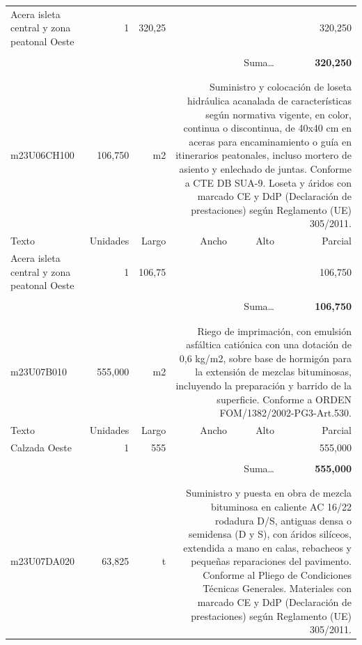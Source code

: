 \documentclass{book}%
\begin{document}
\begin{longtable}{lrrrrr}
\hline%
\multicolumn{1}{p{3.5cm}}{Acera isleta central y zona peatonal Oeste}&1&320,25&&&   320,250\\%
&&&&&\\%
\multicolumn{5}{r}{Suma\ldots}&\textbf{   320,250}\\%
\hline%
&&&&&\\%
&&&&&\\%
m23U06CH100&   106,750& m2&\multicolumn{3}{p{6cm}}{\scriptsize Suministro y colocación de loseta hidráulica acanalada de características según normativa vigente, en color, continua o discontinua, de 40x40 cm en aceras para encaminamiento o guía en itinerarios peatonales, incluso mortero de asiento y enlechado de juntas. Conforme a CTE DB SUA-9. Loseta y áridos con marcado CE y DdP (Declaración de prestaciones) según Reglamento (UE) 305/2011.\normalsize}\\%
Texto&Unidades&Largo&Ancho&Alto&Parcial\\%
\hline%
\multicolumn{1}{p{3.5cm}}{Acera isleta central y zona peatonal Oeste}&1&106,75&&&   106,750\\%
&&&&&\\%
\multicolumn{5}{r}{Suma\ldots}&\textbf{   106,750}\\%
\hline%
&&&&&\\%
&&&&&\\%
m23U07B010&   555,000& m2&\multicolumn{3}{p{6cm}}{\scriptsize Riego de imprimación, con emulsión asfáltica catiónica con una dotación de 0,6 kg/m2, sobre base de hormigón para la extensión de mezclas bituminosas, incluyendo la preparación y barrido de la superficie. Conforme a ORDEN FOM/1382/2002-PG3-Art.530.\normalsize}\\%
Texto&Unidades&Largo&Ancho&Alto&Parcial\\%
\hline%
\multicolumn{1}{p{3.5cm}}{Calzada Oeste}&1&555&&&   555,000\\%
&&&&&\\%
\multicolumn{5}{r}{Suma\ldots}&\textbf{   555,000}\\%
\hline%
&&&&&\\%
&&&&&\\%
m23U07DA020&    63,825& t&\multicolumn{3}{p{6cm}}{\scriptsize Suministro y puesta en obra de mezcla bituminosa en caliente AC 16/22 rodadura D/S, antiguas densa o semidensa (D y S), con áridos silíceos, extendida a mano en calas, rebacheos y pequeñas reparaciones del pavimento. Conforme al Pliego de Condiciones Técnicas Generales. Materiales con marcado CE y DdP (Declaración de prestaciones) según Reglamento (UE) 305/2011.\normalsize}\\%

\end{longtable}
\end{document}
